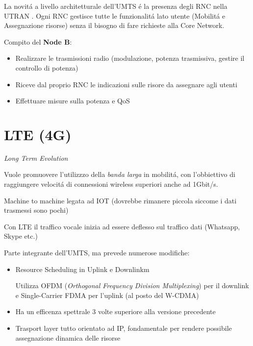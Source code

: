 \documentclass{article}
\begin{document}
La novit\'a a livello architetturale dell'UMTS \'e la presenza degli RNC nella UTRAN . Ogni RNC gestisce tutte le funzionalit\'a lato utente (Mobilit\'a e Assegnazione risorse) senza il bisogno di fare richieste alla Core Network.

Compito del \textbf{Node B}:
\begin{itemize}
    \item Realizzare le trasmissioni radio (modulazione, potenza trasmissiva, gestire il controllo di potenza)
    \item Riceve dal proprio RNC le indicazioni sulle risore da assegnare agli utenti
    \item Effettuare misure sulla potenza e QoS
\end{itemize}


\section{LTE (4G)}
\textit{Long Term Evolution}

Vuole promuovere l'utilizzzo della \textit{banda larga} in mobilit\'a, con l'obbiettivo di raggiungere velocit\'a di connessioni wireless superiori anche ad 1Gbit/s.

Machine to machine legata ad IOT (dovrebbe rimanere piccola siccome i dati trasmessi sono pochi)

Con LTE il traffico vocale inizia ad essere deflesso sul traffico dati (Whatsapp, Skype etc.)

Parte integrante dell'UMTS, ma prevede numerose modifiche:
\begin{itemize}
    \item Resource Scheduling in Uplink e Downlinkm

        Utilizza OFDM (\textit{Orthogonal Frequency Division Multiplexing}) per il downlink e Single-Carrier FDMA per l'uplink (al posto del W-CDMA)
    \item Ha un efficenza spettrale 3 volte superiore alla versione precedente
    \item Trasport layer tutto orientato ad IP, fondamentale per rendere possibile assegnazione dinamica delle risorse
\end{itemize}
\end{document}
